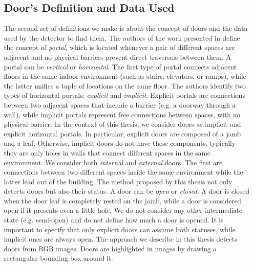 \subsection{Door's Definition and Data Used} 
\label{sec:door_definition}
The second set of definitions we make is about the concept of doors and the data used by the detector to find them. The authors of the work presented in \cite{topologyurban} define the concept of \textit{portal}, which is located whenever a pair of different spaces are adjacent and no physical barriers prevent direct traversals between them.  A portal can be \textit{vertical} or \textit{horizontal}. The first type of portal connects adjacent floors in the same indoor environment (such as stairs, elevators, or ramps), while the latter unifies a tuple of locations on the same floor. The authors identify two types of horizontal portals: \textit{explicit} and \textit{implicit}. Explicit portals are connections between two adjacent spaces that include a barrier (e.g. a doorway through a wall), while implicit portals represent free connections between spaces, with no physical barrier. In the context of this thesis, we consider doors as implicit and explicit horizontal portals. In particular, explicit doors are composed of a jamb and a leaf. Otherwise, implicit doors do not have these components, typically they are only holes in walls that connect different spaces in the same environment. We consider both \textit{internal} and \textit{external} doors. The first are connections between two different spaces inside the same environment while the latter lead out of the building. The method proposed by this thesis not only detects doors but also their status. A door can be \textit{open} or \textit{closed}. A door is closed when the door leaf is completely rested on the jamb, while a door is considered open if it presents even a little hole. We do not consider any other intermediate state (e.g. semi-open) and do not define how much a door is opened. It is important to specify that only explicit doors can assume both statuses, while implicit ones are always open. The approach we describe in this thesis detects doors from RGB images. Doors are highlighted in images by drawing a rectangular bounding box around it.


